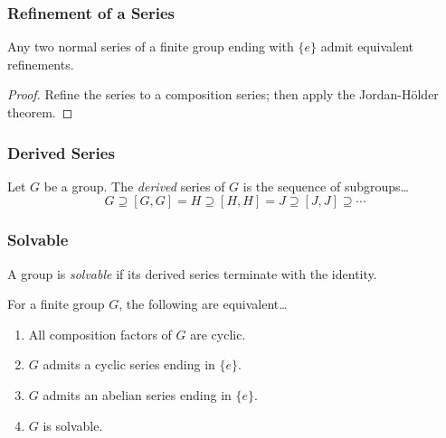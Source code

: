 \subsubsection{Refinement of a Series}\label{refinement}
\begin{proposition}
Any two normal series of a finite group ending with $\{ e \}$ admit equivalent refinements.
\end{proposition}

\begin{proof}
Refine the series to a composition series; then apply the Jordan-H\"older theorem.
\end{proof}

\subsubsection{Derived Series}\label{derivedseries}
Let $G$ be a group. The \emph{derived} series of $G$ is the sequence of subgroups\dots
$$G \supseteq [G,G] = H \supseteq [H,H] = J \supseteq [J,J] \supseteq \cdots$$

\subsubsection{Solvable}\label{solvable}
A group is \emph{solvable} if its derived series terminate with the identity.

\begin{proposition}
\label{solvablecharacterization}
For a finite group $G$, the following are equivalent\dots
\begin{enumerate}
  \item All composition factors of $G$ are cyclic.
  \item $G$ admits a cyclic series ending in $\{ e \}$.
  \item $G$ admits an abelian series ending in $\{ e \}$.
  \item $G$ is solvable.
\end{enumerate}
\end{proposition}

